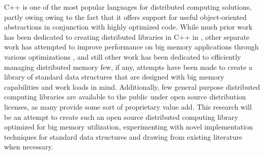 C++ is one of the most popular languages for distributed computing solutions, partly owing owing to the fact that it offers support for useful object-oriented abstractions in conjunction with highly optimized code. \cite{towards_dist_cpp} While much prior work has been dedicated to creating distributed libraries in C++ in \cite{STAPL}  \cite{practical_dist_c}
\cite{taskflow} \cite{intel_tbb} \cite{parallel_programming_w_charm} \cite{chapel} \cite{X10}, other separate work has attempted to improve performance on big memory applications through various optimizations \cite{virtual_memory_tlb}, and still other work has been dedicated to efficiently managing distributed memory \cite{spark} \cite{zookeeper} \cite{memcached} \cite{GAM}  few, if any, attempts have been made to create a library of standard data structures that are designed with big memory capabilities and work loads in mind. Additionally, few general purpose distributed computing libraries are available to the public under open source distribution licenses, as many provide some sort of proprietary value add. This research will be an attempt to create such an open source distributed computing library optimized for big memory utilization, experimenting with novel implementation techniques for standard data structures and drawing from existing literature when necessary. 
